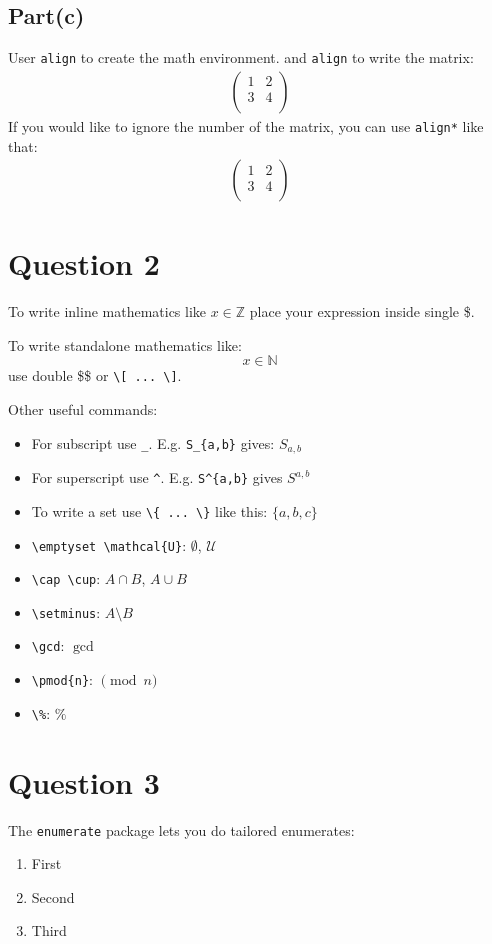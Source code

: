 \documentclass{article} %
\begin{document}
\subsection*{Part(c)}
User \texttt{align} to create the math environment. and \texttt{align} to write the matrix:
\begin{align}
\begin{pmatrix}
	1 & 2 \\
	3 & 4 \\
\end{pmatrix}
\end{align}
If you would like to ignore the number of the matrix, you can use \texttt{align*} like that:
\begin{align*}
\begin{pmatrix}
	1 & 2 \\
	3 & 4 \\
\end{pmatrix}
\end{align*}
\section*{Question 2}
To write inline mathematics like $x \in \mathbb{Z}$ place your expression inside single \$.

To write standalone mathematics like:
\[ x \in \mathbb{N} \]
use double \$\$ or \verb|\[ ... \]|.

Other useful commands: 
\begin{itemize}
\item For subscript use \verb|_|.  E.g. \verb|S_{a,b}| gives: $S_{a,b}$
\item For superscript use \verb|^|.  E.g. \verb|S^{a,b}| gives $S^{a,b}$
\item To write a set use \verb|\{ ... \}| like this: $\{a,b,c\}$
\item \verb|\emptyset \mathcal{U}|: $\emptyset$, $\mathcal{U}$ 
\item \verb|\cap \cup|: $A \cap B$, $A \cup B$
\item \verb|\setminus|: $A \setminus B$ 
\item \verb|\gcd|: $\gcd$
\item \verb|\pmod{n}|: $\pmod{n}$
\item \verb|\%|: $\%$
\end{itemize}


\section*{Question 3}
The \texttt{enumerate} package lets you do tailored enumerates:
\begin{enumerate}[I]
\item First
\item Second
\item Third
\end{enumerate}
\end{document}
